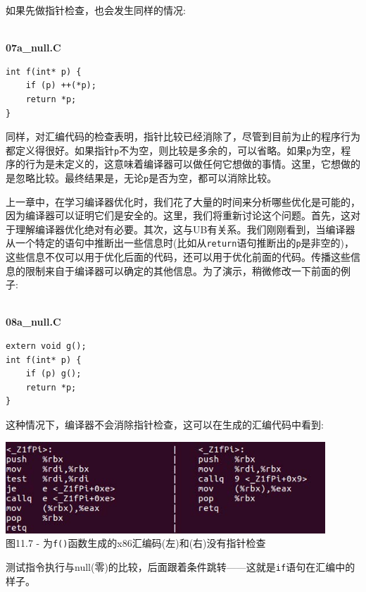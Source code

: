 如果先做指针检查，也会发生同样的情况:

\hspace*{\fill} \\ %
\noindent
\textbf{07a\_null.C}
\begin{lstlisting}[style=styleCXX]
int f(int* p) {
	if (p) ++(*p);
	return *p;
}
\end{lstlisting}

同样，对汇编代码的检查表明，指针比较已经消除了，尽管到目前为止的程序行为都定义得很好。如果指针\texttt{p}不为空，则比较是多余的，可以省略。如果\texttt{p}为空，程序的行为是未定义的，这意味着编译器可以做任何它想做的事情。这里，它想做的是忽略比较。最终结果是，无论\texttt{p}是否为空，都可以消除比较。

上一章中，在学习编译器优化时，我们花了大量的时间来分析哪些优化是可能的，因为编译器可以证明它们是安全的。这里，我们将重新讨论这个问题。首先，这对于理解编译器优化绝对有必要。其次，这与UB有关系。我们刚刚看到，当编译器从一个特定的语句中推断出一些信息时(比如从\texttt{return}语句推断出的\texttt{p}是非空的)，这些信息不仅可以用于优化后面的代码，还可以用于优化前面的代码。传播这些信息的限制来自于编译器可以确定的其他信息。为了演示，稍微修改一下前面的例子:

\hspace*{\fill} \\ %
\noindent
\textbf{08a\_null.C}
\begin{lstlisting}[style=styleCXX]
extern void g();
int f(int* p) {
	if (p) g();
	return *p;
}
\end{lstlisting}

这种情况下，编译器不会消除指针检查，这可以在生成的汇编代码中看到:

\begin{center}
\includegraphics[width=0.9\textwidth]{content/3/chapter11/images/7.jpg}\\
图11.7 - 为\texttt{f()}函数生成的x86汇编码(左)和(右)没有指针检查
\end{center}

测试指令执行与null(零)的比较，后面跟着条件跳转——这就是\texttt{if}语句在汇编中的样子。 

